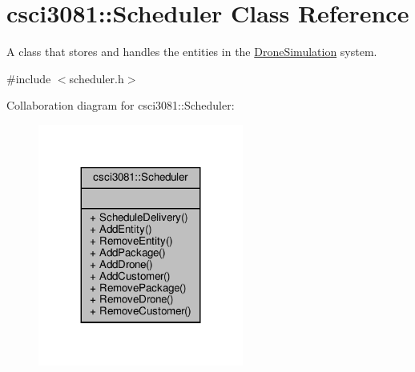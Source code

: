 \hypertarget{classcsci3081_1_1Scheduler}{}\section{csci3081\+:\+:Scheduler Class Reference}
\label{classcsci3081_1_1Scheduler}


A class that stores and handles the entities in the \hyperlink{classcsci3081_1_1DroneSimulation}{Drone\+Simulation} system.  




{\ttfamily \#include $<$scheduler.\+h$>$}



Collaboration diagram for csci3081\+:\+:Scheduler\+:\nopagebreak
\begin{figure}[H]
\begin{center}
\leavevmode
\includegraphics[width=191pt]{classcsci3081_1_1Scheduler__coll__graph}
\end{center}
\end{figure}
